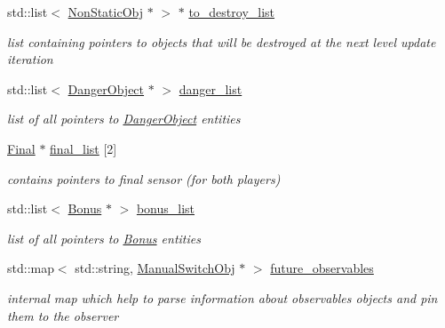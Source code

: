 \begin{DoxyCompactItemize}
std\+::list$<$ \hyperlink{class_non_static_obj}{Non\+Static\+Obj} $\ast$ $>$ $\ast$ \hyperlink{class_storage_ad96cf086d9e0eb5b811504d26737f351}{to\+\_\+destroy\+\_\+list}
\begin{DoxyCompactList}\small\item\em list containing pointers to objects that will be destroyed at the next level update iteration \end{DoxyCompactList}\item 
\mbox{\label{class_storage_a6cb1b8c7f32484e515530c7eb54ed08f}} 
std\+::list$<$ \hyperlink{class_danger_object}{Danger\+Object} $\ast$ $>$ \hyperlink{class_storage_a6cb1b8c7f32484e515530c7eb54ed08f}{danger\+\_\+list}
\begin{DoxyCompactList}\small\item\em list of all pointers to \hyperlink{class_danger_object}{Danger\+Object} entities \end{DoxyCompactList}\item 
\mbox{\label{class_storage_aca489d11da5a79c4ada94fb89aebab69}} 
\hyperlink{class_final}{Final} $\ast$ \hyperlink{class_storage_aca489d11da5a79c4ada94fb89aebab69}{final\+\_\+list} \mbox{[}2\mbox{]}
\begin{DoxyCompactList}\small\item\em contains pointers to final sensor (for both players) \end{DoxyCompactList}\item 
\mbox{\label{class_storage_a16492ba80ed615d1b917a12d8a959fed}} 
std\+::list$<$ \hyperlink{class_bonus}{Bonus} $\ast$ $>$ \hyperlink{class_storage_a16492ba80ed615d1b917a12d8a959fed}{bonus\+\_\+list}
\begin{DoxyCompactList}\small\item\em list of all pointers to \hyperlink{class_bonus}{Bonus} entities \end{DoxyCompactList}\item 
\mbox{\label{class_storage_a9ec3b712f9c20c9c2e82cc07f77ad692}} 
std\+::map$<$ std\+::string, \hyperlink{class_manual_switch_obj}{Manual\+Switch\+Obj} $\ast$ $>$ \hyperlink{class_storage_a9ec3b712f9c20c9c2e82cc07f77ad692}{future\+\_\+observables}
\begin{DoxyCompactList}\small\item\em internal map which help to parse information about observables objects and pin them to the observer \end{DoxyCompactList}\end{DoxyCompactItemize}


